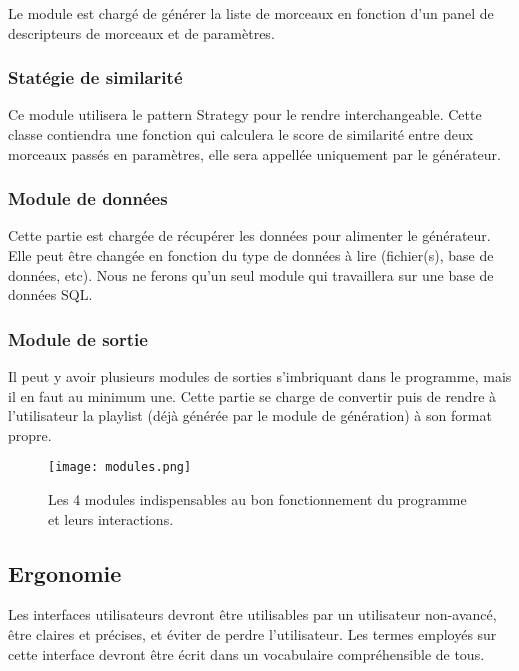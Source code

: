 Le module est chargé de générer la liste de morceaux en fonction d’un panel de
descripteurs de morceaux et de paramètres.

\subsubsection{Statégie de similarité}
\label{besoins:nfonc:perf:mod:similarity}

Ce module utilisera le pattern Strategy pour le rendre interchangeable. Cette classe contiendra une fonction qui calculera le score de similarité entre deux morceaux passés en paramètres, elle sera appellée uniquement par le générateur.

\subsubsection{Module de données}
\label{besoins:nfonc:perf:mod:data}

Cette partie est chargée de récupérer les données pour alimenter le générateur.
Elle peut être changée en fonction du type de données à lire (fichier(s), base de
données, etc). Nous ne ferons qu’un seul module qui travaillera sur une base de
données SQL.

\subsubsection{Module de sortie}
\label{besoins:nfonc:perf:mod:out}

Il peut y avoir plusieurs modules de sorties s'imbriquant dans le programme, mais
il en faut au minimum une. Cette partie se charge de convertir puis de rendre à
l’utilisateur la playlist (déjà générée par le module de génération) à son format
propre.

\begin{figure}[!h]
\texttt{[image: modules.png]}
\caption{Les 4 modules indispensables au bon fonctionnement du programme et leurs
interactions.}
\end{figure}

\subsection{Ergonomie}
\label{besoins:nfonc:perf:erg}
Les interfaces utilisateurs devront être utilisables par un utilisateur
non-avancé, être claires et précises, et éviter de perdre l’utilisateur. Les
termes employés sur cette interface devront être écrit dans un vocabulaire
compréhensible de tous.

